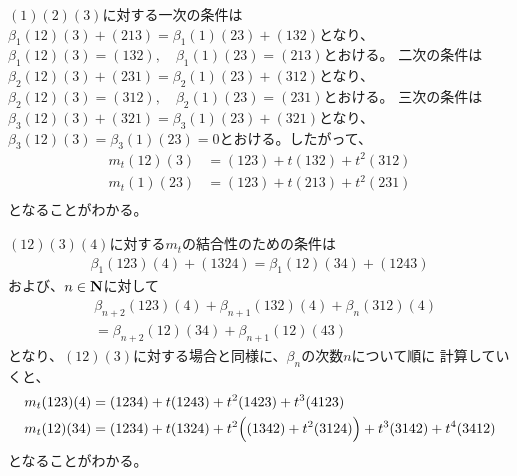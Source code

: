 		$(1)(2)(3)$に対する一次の条件は
		$\beta_1(12)(3) + (213)=\beta_1(1)(23) + (132)$となり、
		$\beta_1(12)(3) = (132),\quad \beta_1(1)(23) = (213)$とおける。 
		二次の条件は
		$\beta_2(12)(3)+(231)=\beta_2(1)(23)+(312)$となり、
		$\beta_2(12)(3)=(312),\quad\beta_2(1)(23)=(231)$とおける。
		三次の条件は$\beta_3(12)(3)+(321)= \beta_3(1)(23)+(321)$となり、
		$\beta_3(12)(3)=\beta_3(1)(23)=0$とおける。したがって、
		\begin{equation*}\begin{split} %
			m_t(12)(3) &= (123) + t(132) + t^2(312) \\
			m_t(1)(23) &= (123) + t(213) + t^2(231) \\
		\end{split}\end{equation*} %
		となることがわかる。

		$(12)(3)(4)$に対する$m_t$の結合性のための条件は
		\begin{equation*}\begin{split} %
			\beta_1(123)(4)+(1324)=\beta_1(12)(34)+(1243)
		\end{split}\end{equation*} %
		および、$n\in{\mathbf{N}}$に対して
		\begin{equation*}\begin{split} %
			&\beta_{n+2}(123)(4) +\beta_{n+1}(132)(4) +\beta_{n}(312)(4) \\
			&= \beta_{n+2}(12)(34)+\beta_{n+1}(12)(43)
		\end{split}\end{equation*} %
		となり、$(12)(3)$に対する場合と同様に、$\beta_n$の次数$n$について順に
		計算していくと、
		\begin{equation*}\begin{split} %
			m_t(123)(4) &= (1234)+ t(1243)+ t^2(1423)+ t^3(4123) \\
			m_t(12)(34) &= (1234)+ t(1324)+ t^2\Bigl((1342)+ t^2(3124)\Bigr)
			+ t^3(3142)+ t^4(3412)
		\end{split}\end{equation*} %
		となることがわかる。


